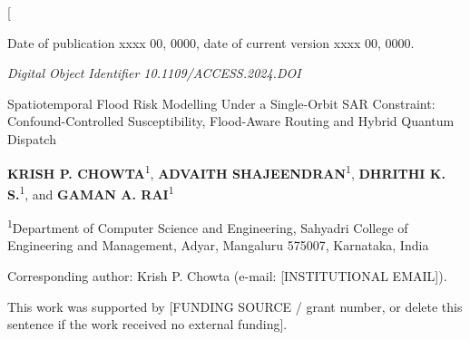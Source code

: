 \documentclass[10pt,twocolumn]{article}
\begin{document}
\thispagestyle{accessfirst}
\twocolumn[
\begin{@twocolumnfalse}
\vspace*{-2pt}

{\fontsize{7.5}{9}\selectfont
Date of publication xxxx 00, 0000, date of current version xxxx 00, 0000.\par}
{\fontsize{6}{8}\selectfont\itshape
Digital Object Identifier 10.1109/ACCESS.2024.DOI\par}

\vspace{18pt}

{\helv\fontsize{22}{25}\bfseries\color{accessblue}\raggedright
Spatiotemporal Flood Risk Modelling Under a Single-Orbit SAR Constraint: Confound-Controlled Susceptibility, Flood-Aware Routing and Hybrid Quantum Dispatch\par}

\vspace{12pt}

\begin{minipage}{\dimexpr\textwidth-0.958in\relax}
{\helv\fontsize{10}{12}\selectfont\raggedright
\textbf{KRISH P. CHOWTA}\textsuperscript{1},
\textbf{ADVAITH SHAJEENDRAN}\textsuperscript{1},
\textbf{DHRITHI K. S.}\textsuperscript{1},
and \textbf{GAMAN A. RAI}\textsuperscript{1}\par}

\vspace{5pt}

{\fontsize{7.5}{9}\selectfont\raggedright
\textsuperscript{1}Department of Computer Science and Engineering, Sahyadri College of Engineering and Management, Adyar, Mangaluru 575007, Karnataka, India

Corresponding author: Krish P. Chowta (e-mail: [INSTITUTIONAL EMAIL]).\par}
\end{minipage}

\vspace{10pt}

{\fontsize{7}{9}\selectfont
This work was supported by [FUNDING SOURCE / grant number, or delete this sentence if the work received no external funding].\par}

\vspace{12pt}


\end{@twocolumnfalse}
\end{document}
